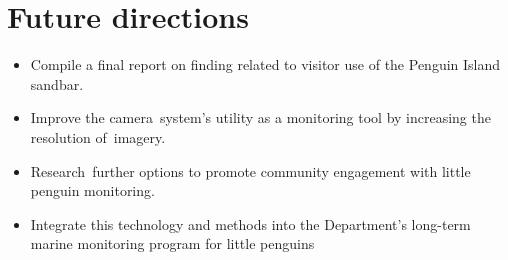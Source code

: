 \documentclass[version=last,
    paper=a4, %
    10pt, %
    usenames,
    dvipsnames,
    oneside, %
    headings=openany, %
    DIV=15 %
]{scrbook}
\begin{document}
\section*{Future directions}
\begin{itemize}
\itemsep1pt\parskip0pt
\item
  Compile a final report on finding related to visitor use of the
  Penguin Island sandbar.
\item
  Improve the camera~system's utility as a monitoring tool by increasing
  the resolution of~imagery.
\item
  Research~further options to promote community engagement with little
  penguin monitoring.
\item
  Integrate this technology and methods into the Department's long-term
  marine monitoring program for little penguins
\end{itemize}



\end{document}
